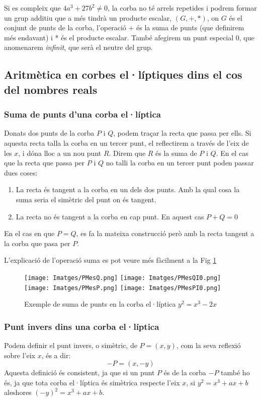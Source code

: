 \documentclass[journal]{IEEEtran}
\begin{document}
Si es compleix que $4a^3 + 27 b^2 \neq 0$, la corba no té arrels repetides i podrem formar un grup additiu que a més tindrà un producte escalar, $(G,+,*)$, on $G$ és el conjunt de punts de la corba, l'operació + és la suma de punts (que definirem més endavant) i * és el producte escalar. També afegirem un punt especial $0$, que anomenarem \emph{infinit}, que serà el neutre del grup.
\subsection{Aritmètica en corbes el·líptiques dins el cos del nombres reals}
\subsubsection{Suma de punts d'una corba el·líptica} 
Donats dos punts de la corba $P$ i $Q$, podem traçar la recta que passa per ells. Si aquesta recta talla la corba en un tercer punt, el reflectirem a través de l'eix de les $x$, i dóna lloc a un nou punt $R$. Direm que $R$ és la suma de $P$ i $Q$. En el cas que la recta que passa per $P$ i $Q$ no talli la corba en un tercer punt poden passar dues coses:
\begin{enumerate}
\item La recta és tangent a la corba en un dels dos punts. Amb la qual cosa la suma seria el simètric del punt on és tangent.
\item La recta no és tangent a la corba en cap punt. En aquest cas $P+Q=0$
\end{enumerate}

En el cas en que $P = Q$, es fa la mateixa construcció però amb la recta tangent a la corba que pasa per $P$.

L'explicació de l'operació suma es pot veure més fàcilment a la Fig \ref{Suma}
\begin{figure}[h!]
\texttt{[image: Imatges/PMesQ.png]}
\texttt{[image: Imatges/PMesQI0.png]}
\texttt{[image: Imatges/PMesP.png]}
\texttt{[image: Imatges/PMesPI0.png]}

\caption{Exemple de suma de punts en la corba el·líptica $y^2 = x^3 -2x$} \label{Suma}
\end{figure}
\subsubsection{Punt invers dins una corba el·líptica}
Podem definir el punt invers, o simètric, de $P=(x,y)$, com la seva reflexió sobre l'eix $x$, és a dir:
\[
-P=(x,-y)
\]
Aquesta definició és consistent, ja que si un punt $P$ és de la corba $-P$ també ho és, ja que tota corba el·líptica és simètrica respecte l'eix $x$, si $y^2 = x^3+ax+b$ aleshores $(-y)^2= x^3+ax+b$.
\end{document}
